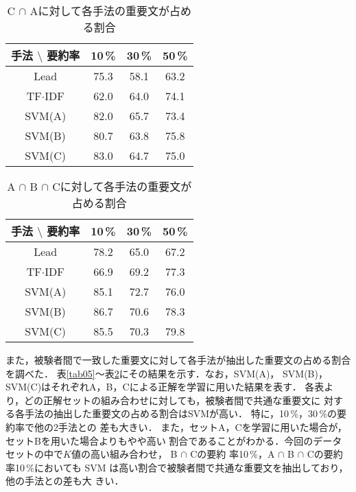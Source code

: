 \begin{table}[t]
 \begin{center}
  \caption{C $\cap$ Aに対して各手法の重要文が占める割合}
  \label{tab07}
  \begin{tabular}{c|c|c|c}
   \hline
   \hline
   手法  $\setminus$ 要約率& 10\,\%  & 30\,\% & 50\,\% \\
   \hline
   Lead & 75.3 & 58.1 & 63.2\\
   TF$\cdot$IDF & 62.0 & 64.0 & 74.1\\
   \hline
   SVM(A) &  82.0 &  65.7 & 73.4\\ 
   SVM(B) &  80.7 &  63.8 & 75.8\\ 
   SVM(C) &  83.0 &  64.7 & 75.0\\ 
   \hline
  \end{tabular}
 \end{center}
\end{table}

\begin{table}[t]
 \begin{center}
  \caption{A $\cap$ B $\cap$ Cに対して各手法の重要文が占める割合}
  \label{tab08}
  \begin{tabular}{c|c|c|c}
   \hline
   \hline
   手法  $\setminus$ 要約率& 10\,\%  & 30\,\% & 50\,\% \\
   \hline
   Lead & 78.2 & 65.0 & 67.2\\
   TF$\cdot$IDF & 66.9 & 69.2 & 77.3\\
   \hline
   SVM(A) & 85.1 & 72.7 & 76.0\\ 
   SVM(B) & 86.7 & 70.6 & 78.3\\ 
   SVM(C) & 85.5 & 70.3 & 79.8\\ 
   \hline
  \end{tabular}
 \end{center}
\end{table}


また，被験者間で一致した重要文に対して各手法が抽出した重要文の占める割合
を調べた．
表\ref{tab05}〜表\ref{tab08}にその結果を示す．なお，SVM(A)，
SVM(B)，SVM(C)はそれぞれA，B，Cによる正解を学習に用いた結果を表す．
各表より，どの正解セットの組み合わせに対しても，被験者間で共通な重要文に
対する各手法の抽出した重要文の占める割合はSVMが高い．
特に，10\,\%，30\,\%の要約率で他の2手法との
差も大きい．
また，セットA，Cを学習に用いた場合が，セットBを用いた場合よりもやや高い
割合であることがわかる．今回のデータセットの中で$K$値の高い組み合わせ，
B $\cap$ Cの要約
率10\,\%，A $\cap$ B $\cap$ Cの要約率10\,\%においても
SVM は高い割合で被験者間で共通な重要文を抽出しており，他の手法との差も大
きい．

